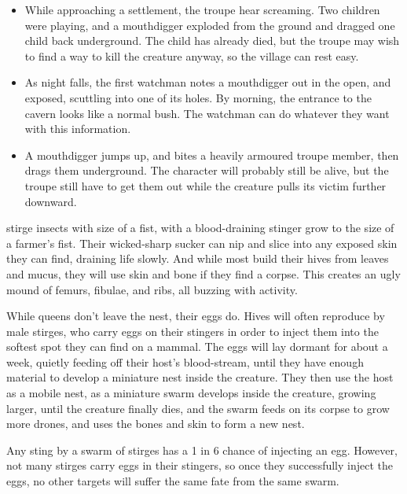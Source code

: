 \begin{multicols}{2}
\begin{itemize}

  \item
  While approaching a settlement, the troupe hear screaming.
  Two children were playing, and a mouthdigger exploded from the ground and dragged one child back underground.
  The child has already died, but the troupe may wish to find a way to kill the creature anyway, so the \gls{village} can rest easy.
  \item
  As night falls, the first watchman notes a mouthdigger out in the open, and exposed, scuttling into one of its holes.
  By morning, the entrance to the cavern looks like a normal bush.
  The watchman can do whatever they want with this information.
  \item
  A mouthdigger jumps up, and bites a heavily armoured troupe member, then drags them underground.
  The character will probably still be alive, but the troupe still have to get them out while the creature pulls its victim further downward.

\end{itemize}

\mouthdigger

  {stirge}%
  {insects with size of a fist, with a blood-draining stinger}%
grow to the size of a farmer's fist.
Their wicked-sharp sucker can nip and slice into any exposed skin they can find, draining life slowly.
And while most build their hives from leaves and mucus, they will use skin and bone if they find a corpse.
This creates an ugly mound of femurs, fibulae, and ribs, all buzzing with activity.

While queens don't leave the nest, their eggs do.
Hives will often reproduce by male stirges, who carry eggs on their stingers in order to inject them into the softest spot they can find on a mammal.
The eggs will lay dormant for about a week, quietly feeding off their host's blood-stream, until they have enough material to develop a miniature nest inside the creature.
They then use the host as a mobile nest, as a miniature swarm develops inside the creature, growing larger, until the creature finally dies, and the swarm feeds on its corpse to grow more drones, and uses the bones and skin to form a new nest.

\label{stirgeEggs}
Any sting by a swarm of stirges has a 1 in 6 chance of injecting an egg.
However, not many stirges carry eggs in their stingers, so once they successfully inject the eggs, no other targets will suffer the same fate from the same swarm.


\end{multicols}
